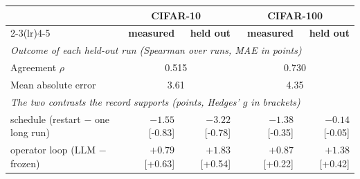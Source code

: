 \begin{tabular}{l rr rr}
\toprule
& \multicolumn{2}{c}{CIFAR-10} & \multicolumn{2}{c}{CIFAR-100} \\
\cmidrule(lr){2-3}\cmidrule(lr){4-5}
& \textbf{measured} & \textbf{held out} & \textbf{measured} & \textbf{held out} \\
\midrule
\multicolumn{5}{l}{\textit{Outcome of each held-out run (Spearman over runs, MAE in points)}} \\
Agreement $\rho$ & \multicolumn{2}{c}{0.515} & \multicolumn{2}{c}{0.730} \\
Mean absolute error & \multicolumn{2}{c}{3.61} & \multicolumn{2}{c}{4.35} \\
\midrule
\multicolumn{5}{l}{\textit{The two contrasts the record supports (points, Hedges' $g$ in brackets)}} \\
schedule (restart $-$ one long run) & $-1.55$ [-0.83] & $-3.22$ [-0.78] & $-1.38$ [-0.35] & $-0.14$ [-0.05] \\
operator loop (LLM $-$ frozen) & $+0.79$ [+0.63] & $+1.83$ [+0.54] & $+0.87$ [+0.22] & $+1.38$ [+0.42] \\
\bottomrule
\end{tabular}
